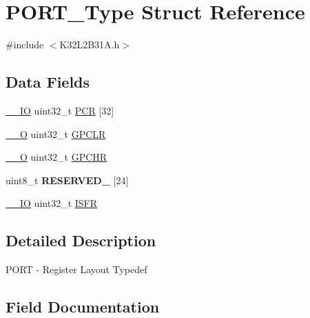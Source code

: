 \hypertarget{struct_p_o_r_t___type}{}\section{P\+O\+R\+T\+\_\+\+Type Struct Reference}
\label{struct_p_o_r_t___type}


{\ttfamily \#include $<$K32\+L2\+B31\+A.\+h$>$}

\subsection*{Data Fields}
\begin{DoxyCompactItemize}
\item 
\mbox{\hyperlink{core__cm0plus_8h_aec43007d9998a0a0e01faede4133d6be}{\+\_\+\+\_\+\+IO}} uint32\+\_\+t \mbox{\hyperlink{struct_p_o_r_t___type_a25bc9eea888d201d852deb4819850bb2}{P\+CR}} \mbox{[}32\mbox{]}
\item 
\mbox{\hyperlink{core__cm0plus_8h_a7e25d9380f9ef903923964322e71f2f6}{\+\_\+\+\_\+O}} uint32\+\_\+t \mbox{\hyperlink{struct_p_o_r_t___type_a7ca65d71461aa5e76eb2266ab7ccd0cf}{G\+P\+C\+LR}}
\item 
\mbox{\hyperlink{core__cm0plus_8h_a7e25d9380f9ef903923964322e71f2f6}{\+\_\+\+\_\+O}} uint32\+\_\+t \mbox{\hyperlink{struct_p_o_r_t___type_abc885669f9579a0514a37a62fc070ec7}{G\+P\+C\+HR}}
\item 
\mbox{\label{struct_p_o_r_t___type_a33a1c574e559dc57bb2fc28166bf6341}} 
uint8\+\_\+t {\bfseries R\+E\+S\+E\+R\+V\+E\+D\+\_} \mbox{[}24\mbox{]}
\item 
\mbox{\hyperlink{core__cm0plus_8h_aec43007d9998a0a0e01faede4133d6be}{\+\_\+\+\_\+\+IO}} uint32\+\_\+t \mbox{\hyperlink{struct_p_o_r_t___type_a810f6911c38333115775f924be784050}{I\+S\+FR}}
\end{DoxyCompactItemize}


\subsection{Detailed Description}
P\+O\+RT -\/ Register Layout Typedef 

\subsection{Field Documentation}
\mbox{\label{struct_p_o_r_t___type_abc885669f9579a0514a37a62fc070ec7}} 
